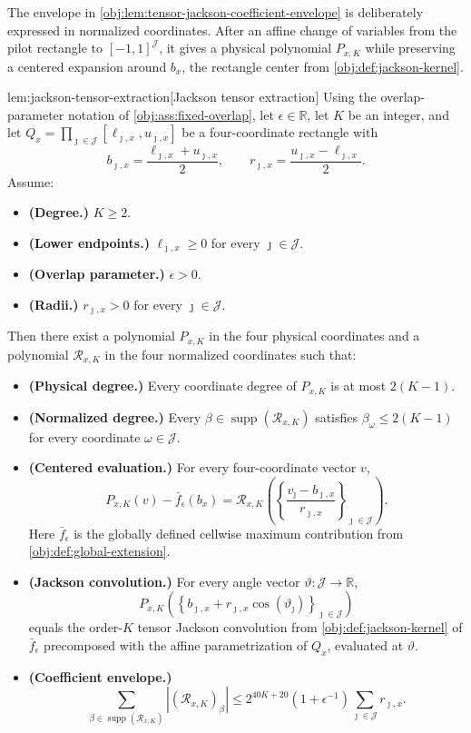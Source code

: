 \documentclass[11pt]{article}
\begin{document}
The envelope in \cref{obj:lem:tensor-jackson-coefficient-envelope} is deliberately expressed in normalized coordinates. After an affine change of variables from the pilot rectangle to \([-1,1]^{\mathcal J}\), it gives a physical polynomial \(P_{x,K}\) while preserving a centered expansion around \(b_x\), the rectangle center from \cref{obj:def:jackson-kernel}.

\begin{lemmav}{lem:jackson-tensor-extraction}[Jackson tensor extraction]
Using the overlap-parameter notation of \cref{obj:ass:fixed-overlap}, let \(\epsilon\in\mathbb R\), let \(K\) be an integer, and let
\(Q_x=\prod_{\jmath\in\mathcal J}[\ell_{\jmath,x},u_{\jmath,x}]\) be a four-coordinate rectangle with
\[
b_{\jmath,x}=\frac{\ell_{\jmath,x}+u_{\jmath,x}}{2},
\qquad
r_{\jmath,x}=\frac{u_{\jmath,x}-\ell_{\jmath,x}}{2}.
\]
Assume:
\begin{itemize}
\item \textbf{(Degree.)} \(K\ge 2\).
\item \textbf{(Lower endpoints.)} \(\ell_{\jmath,x}\ge 0\) for every \(\jmath\in\mathcal J\).
\item \textbf{(Overlap parameter.)} \(\epsilon>0\).
\item \textbf{(Radii.)} \(r_{\jmath,x}>0\) for every \(\jmath\in\mathcal J\).
\end{itemize}
Then there exist a polynomial \(P_{x,K}\) in the four physical coordinates and a polynomial
\(\mathcal R_{x,K}\) in the four normalized coordinates such that:
\begin{itemize}
\item \textbf{(Physical degree.)} Every coordinate degree of \(P_{x,K}\) is at most \(2(K-1)\).
\item \textbf{(Normalized degree.)} Every \(\beta\in\operatorname{supp}(\mathcal R_{x,K})\) satisfies
\(\beta_\omega\le 2(K-1)\) for every coordinate \(\omega\in\mathcal J\).
\item \textbf{(Centered evaluation.)} For every four-coordinate vector \(v\),
\[
P_{x,K}(v)-\bar f_\epsilon(b_x)
=
\mathcal R_{x,K}\left(\left\{\frac{v_\jmath-b_{\jmath,x}}{r_{\jmath,x}}\right\}_{\jmath\in\mathcal J}\right).
\]
Here \(\bar f_\epsilon\) is the globally defined cellwise maximum contribution from
\cref{obj:def:global-extension}.
\item \textbf{(Jackson convolution.)} For every angle vector \(\vartheta:\mathcal J\to\mathbb R\),
\[
P_{x,K}\left(\left\{b_{\jmath,x}+r_{\jmath,x}\cos(\vartheta_\jmath)\right\}_{\jmath\in\mathcal J}\right)
\]
equals the order-\(K\) tensor Jackson convolution from \cref{obj:def:jackson-kernel} of
\(\bar f_\epsilon\) precomposed with the affine parametrization of \(Q_x\), evaluated at
\(\vartheta\).
\item \textbf{(Coefficient envelope.)}
\[
\sum_{\beta\in\operatorname{supp}(\mathcal R_{x,K})}
\left|(\mathcal R_{x,K})_\beta\right|
\le
2^{40K+20}(1+\epsilon^{-1})\sum_{\jmath\in\mathcal J}r_{\jmath,x}.
\]
\end{itemize}
\end{lemmav}
\end{document}

